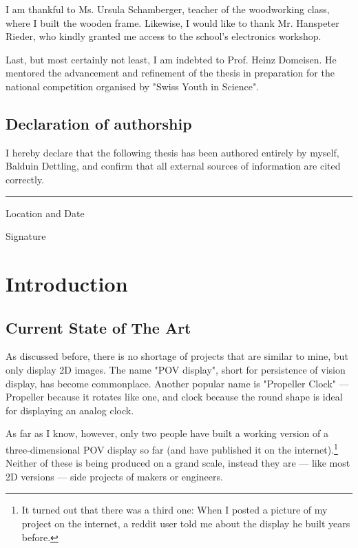 \documentclass[a4paper, 11pt, titlepage]{report}
\begin{document}
I am thankful to Ms. Ursula Schamberger, teacher of the woodworking class, where I built the
wooden frame. Likewise, I would like to thank Mr. Hanspeter Rieder, who kindly granted me
access to the school's electronics workshop.

Last, but most certainly not least, I am indebted to Prof. Heinz Domeisen. He mentored the
advancement and refinement of the thesis in preparation for the national competition organised
by "Swiss Youth in Science".

\section*{Declaration of authorship}

I hereby declare that the following thesis has been authored entirely by myself, Balduin
Dettling, and confirm that all external sources of information are cited correctly.

\vspace{10mm}
\rule{\textwidth}{0.5pt}
\begin{minipage}[t]{0.5\textwidth}
Location and Date
\end{minipage}
\begin{minipage}[t]{0.5\textwidth}
\hspace{-1mm}Signature
\end{minipage}


\tableofcontents



\chapter{Introduction}


\section{Current State of The Art}

As discussed before, there is no shortage of projects that are similar to mine, but only
display 2D images. The name "POV display", short for persistence of vision display, has become
commonplace. Another popular name is "Propeller Clock" --- Propeller because it rotates like one,
and clock because the round shape is ideal for displaying an analog clock.

As far as I know, however, only two people have built a working version of a three-dimensional
POV display so far (and have published it on the internet).\footnote{It turned out that there was
a third one: When I posted a picture of my project on the internet, a reddit user told me about
the display he built years before.}
Neither of these is being produced on a grand scale, instead they are --- like most 2D versions
--- side projects of makers or engineers.
\end{document}
